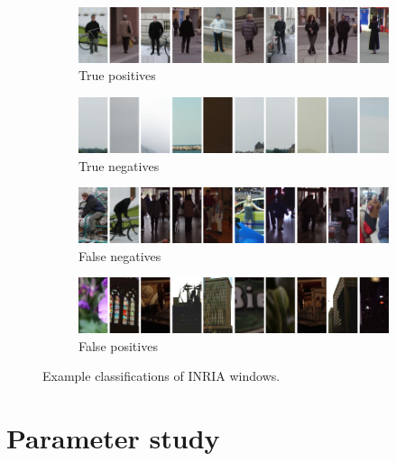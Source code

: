 \documentclass[thesis.tex]{subfiles}
\begin{document}
\begin{figure}
	\centering
	\begin{subfigure}[t]{\textwidth}
		\includegraphics[width=\textwidth]{img/objectDetectionTP.png}
		\caption{True positives}
		\label{fig:objectDetectionTP}
		\vspace{2mm}
	\end{subfigure}
	\begin{subfigure}[t]{\textwidth}
		\includegraphics[width=\textwidth]{img/objectDetectionTN.png}
		\caption{True negatives}
		\label{fig:objectDetectionTN}
		\vspace{2mm}
	\end{subfigure}
	\begin{subfigure}[t]{\textwidth}
		\includegraphics[width=\textwidth]{img/objectDetectionFN.png}
		\caption{False negatives}
		\label{fig:objectDetectionFN}
		\vspace{2mm}
	\end{subfigure}
	\begin{subfigure}[t]{\textwidth}
		\includegraphics[width=\textwidth]{img/objectDetectionFP.png}
		\caption{False positives}
		\label{fig:objectDetectionFP}
	\end{subfigure}
	\caption{Example classifications of INRIA windows.}
	\label{fig:imageCorrespondenceCurves}
\end{figure}

\section{Parameter study}
\label{sec:odParameterStudy}

\subbibliography
\end{document}
